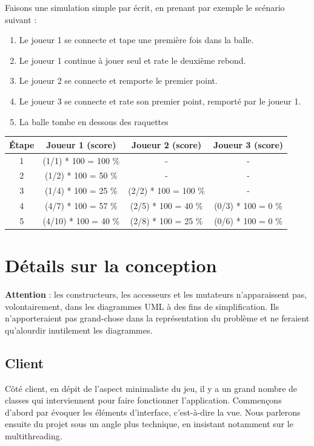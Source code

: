 \documentclass[a4paper,12pt]{article}
\begin{document}
Faisons une simulation simple par écrit, en prenant par exemple le scénario suivant :
\begin{enumerate}
  \item{Le joueur 1 se connecte et tape une première fois dans la balle.}
  \item{Le joueur 1 continue à jouer seul et rate le deuxième rebond.}
  \item{Le joueur 2 se connecte et remporte le premier point.}
  \item{Le joueur 3 se connecte et rate son premier point, remporté par le joueur 1.}
  \item{La balle tombe en dessous des raquettes}
\end{enumerate}

\newpage

\begin{tabular}{|c|c|c|c|}
    \hline
    Étape & Joueur 1 (score) & Joueur 2 (score) & Joueur 3 (score) \\
    \hline
    1 & (1/1) * 100 = 100 \% & - & - \\
    \hline
    2 & (1/2) * 100 = 50 \% & - & - \\
    \hline
    3 & (1/4) * 100 = 25 \% & (2/2) * 100 = 100 \% & - \\
    \hline
    4 & (4/7) * 100 = 57 \% & (2/5) * 100 = 40 \% & (0/3) * 100 = 0 \% \\
    \hline
    5 & (4/10) * 100 = 40 \% & (2/8) * 100 = 25 \% & (0/6) * 100 = 0 \% \\
    \hline
\end{tabular}

\section{Détails sur la conception}

\textbf{Attention} : les constructeurs, les accesseurs et les mutateurs n'apparaissent pas, volontairement, dans les diagrammes UML à des fins de simplification. Ils n'apporteraient pas grand-chose dans la représentation du problème et ne feraient qu'alourdir inutilement les diagrammes.

\subsection{Client}

Côté client, en dépit de l'aspect minimaliste du jeu, il y a un grand nombre de classes qui interviennent pour faire fonctionner l'application. Commençons d'abord par évoquer les éléments d'interface, c'est-à-dire la vue. Nous parlerons ensuite du projet sous un angle plus technique, en insistant notamment sur le multithreading.
\end{document}
